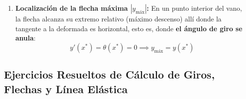 \begin{enumerate}
\begin{itemize}
              \item Donde $Q_y(x) = 0$: el diagrama de giros $y'(x)$ presenta un \textbf{punto de inflexión} (cambio de curvatura de cóncava a convexa o viceversa).
          \end{itemize}
    \item \textbf{Localización de la flecha máxima $|y_{\text{máx}}|$:} En un punto interior del vano, la flecha alcanza su extremo relativo (máximo descenso) allí donde la tangente a la deformada es horizontal, esto es, donde \textbf{el ángulo de giro se anula}:
          \begin{equation}
              y'(x^*) = \theta(x^*) = 0 \implies y_{\text{máx}} = y(x^*)
          \end{equation}
\end{enumerate}

\subsection{Ejercicios Resueltos de Cálculo de Giros, Flechas y Línea Elástica}

